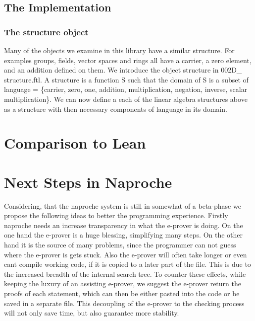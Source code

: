 \documentclass[11pt]{article}
\begin{document}
\begin{figure}[h]
\begin{center}
\end{center}
\end{figure}

\subsection{The Implementation}

\subsubsection{The structure object}
Many of the objects we examine in this library have a similar structure. For examples groups, fields, vector spaces and rings all have a carrier, a zero element, and an addition defined on them. We introduce the object structure in 002D\_ structure.ftl. 
A structure is a function S such that the domain of S is a subset of language =  \{carrier, zero, one, addition, multiplication, negation, inverse, scalar multiplication\}. We can now define a each of the linear algebra structures above as a structure with then necessary components of language in its domain. 



\section{Comparison to Lean}


\section{Next Steps in Naproche}

Considering, that the naproche system is still in somewhat of a beta-phase we propose the following ideas to better the programming experience.
Firstly naproche needs an increase transparency in what the e-prover is doing. On the one hand the e-prover is a huge blessing, simplifying many steps. On the other hand it is the source of many problems, since the programmer can not guess where the e-prover is gets stuck. Also the e-prover will often take longer or even cant compile working code, if it is copied to a later part of the file. This is due to the increased breadth of the internal search tree. To counter these effects, while keeping the luxury of an assisting e-prover, we suggest the e-prover return the proofs of each statement, which can then be either pasted into the code or be saved in a separate file. This decoupling of the e-prover to the checking process will not only save time, but also guarantee more stability. 
\end{document}
